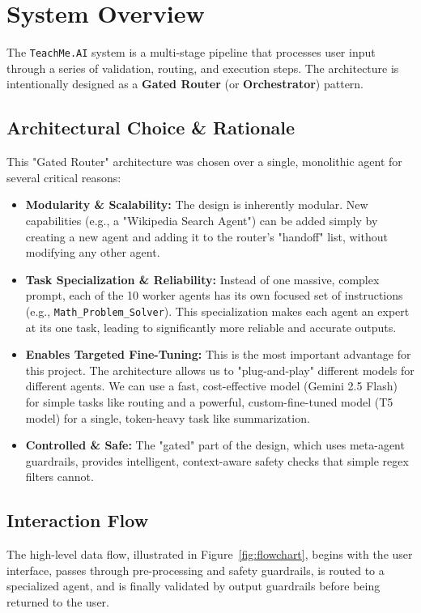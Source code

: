 \documentclass{article}
\begin{document}
\section{System Overview}
The \texttt{TeachMe.AI} system is a multi-stage pipeline that processes user input through a series of validation, routing, and execution steps. The architecture is intentionally designed as a \textbf{Gated Router} (or \textbf{Orchestrator}) pattern.

\subsection{Architectural Choice \& Rationale}
This "Gated Router" architecture was chosen over a single, monolithic agent for several critical reasons:
\begin{itemize}
    \item \textbf{Modularity \& Scalability:} The design is inherently modular. New capabilities (e.g., a "Wikipedia Search Agent") can be added simply by creating a new agent and adding it to the router's "handoff" list, without modifying any other agent.
    \item \textbf{Task Specialization \& Reliability:} Instead of one massive, complex prompt, each of the 10 worker agents has its own focused set of instructions (e.g., \texttt{Math\_Problem\_Solver}). This specialization makes each agent an expert at its one task, leading to significantly more reliable and accurate outputs.
    \item \textbf{Enables Targeted Fine-Tuning:} This is the most important advantage for this project. The architecture allows us to "plug-and-play" different models for different agents. We can use a fast, cost-effective model (Gemini 2.5 Flash) for simple tasks like routing and a powerful, custom-fine-tuned model (T5 model) for a single, token-heavy task like summarization.
    \item \textbf{Controlled \& Safe:} The "gated" part of the design, which uses meta-agent guardrails, provides intelligent, context-aware safety checks that simple regex filters cannot.
\end{itemize}

\subsection{Interaction Flow}
The high-level data flow, illustrated in Figure~\ref{fig:flowchart}, begins with the user interface, passes through pre-processing and safety guardrails, is routed to a specialized agent, and is finally validated by output guardrails before being returned to the user.
\end{document}
